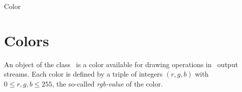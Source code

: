 \ccSetTwoColumns{}{\hspace*{8cm}}



\begin{ccClass} {Color}
\section{Colors}

\ccDefinition
An object of the class \ccClassName\ is a color available
for drawing operations in \cgal\ output streams.
Each color is defined by a triple of integers $(r,g,b)$ with
$0\le r,g,b \le 255$, the so-called {\em rgb-value} of the color.

\end{ccClass} 
